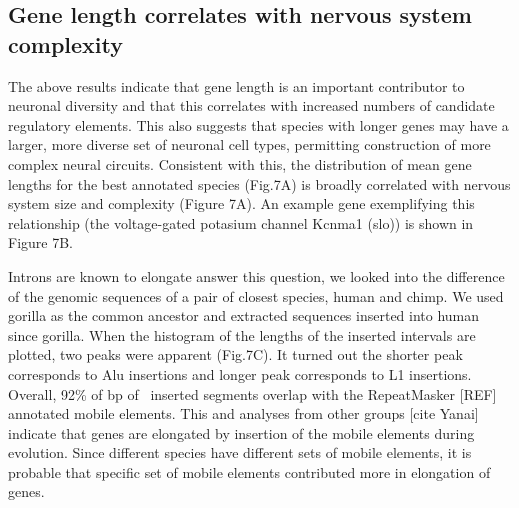 \subsection{Gene length correlates with nervous system complexity}

The above results indicate that gene length is an important contributor to neuronal diversity and that this correlates with increased numbers of candidate regulatory elements. This also suggests that species with longer genes may have a larger, more diverse set of neuronal cell types, permitting construction of more complex neural circuits. Consistent with this, the distribution of mean gene lengths for the best annotated species (Fig.7A) is broadly correlated with nervous system size and complexity (Figure 7A). An example gene exemplifying this relationship (the voltage-gated potasium channel Kcnma1 (slo)) is shown in Figure 7B. 

Introns are known to elongate   answer this question, we looked into the difference of the genomic sequences of a pair of closest species, human and chimp. We used gorilla as the common ancestor and extracted sequences inserted into human since gorilla. When the histogram of the lengths of the inserted intervals are plotted, two peaks were apparent (Fig.7C). It turned out the shorter peak corresponds to Alu insertions and longer peak corresponds to L1 insertions. Overall, 92\% of bp of \ inserted segments overlap with the RepeatMasker [REF] annotated mobile elements. This and analyses from other groups [cite Yanai] indicate that genes are elongated by insertion of the mobile elements during evolution. Since different species have different sets of mobile elements, it is probable that specific set of mobile elements contributed more in elongation of genes.
